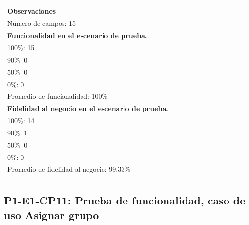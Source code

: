 \documentclass[oneside,10pt]{book}
\begin{document}
\begin{tabularx}{\textwidth}{ X }
\multicolumn{1}{X}{\cellcolor[HTML]{9B9B9B}\textbf{Observaciones}} \\ \hline
\multicolumn{1}{|l|}{Número de campos: 15 }	\\
\multicolumn{1}{|l|}{\textbf{Funcionalidad en el escenario de prueba.} }	\\
\multicolumn{1}{|l|}{100\%: 15 }	\\
\multicolumn{1}{|l|}{90\%: 0 }	\\
\multicolumn{1}{|l|}{50\%: 0 }	\\
\multicolumn{1}{|l|}{0\%: 0 }	\\
\multicolumn{1}{|l|}{Promedio de funcionalidad: 100\% }	\\
\multicolumn{1}{|l|}{\textbf{Fidelidad al negocio en el escenario de prueba.} }	\\
\multicolumn{1}{|l|}{100\%: 14 }	\\
\multicolumn{1}{|l|}{90\%: 1 }	\\
\multicolumn{1}{|l|}{50\%: 0 }	\\
\multicolumn{1}{|l|}{0\%: 0 }	\\
\multicolumn{1}{|l|}{Promedio de fidelidad al negocio: 99.33\% }	\\
\multicolumn{1}{|l|}{ }	\\ \hline
\end{tabularx}
\newpage
\subsection{P1-E1-CP11: Prueba de funcionalidad, caso de uso Asignar grupo}
\end{document}
